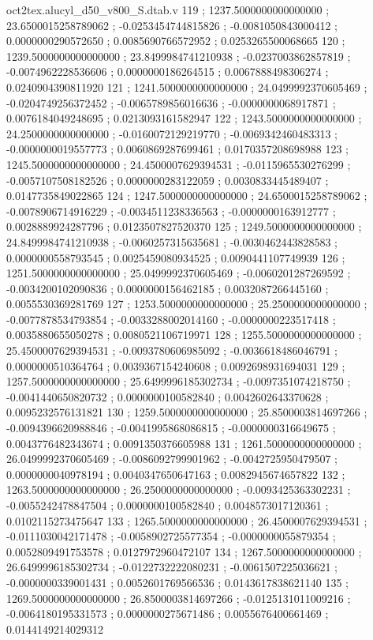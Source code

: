 \begin{filecontents}[overwrite]{oct2tex.alucyl_d50_v800_S.dtab.v}
119 ; 1237.5000000000000000 ; 23.6500015258789062 ; -0.0253454744815826 ; -0.0081050843000412 ; 0.0000000290572650 ; 0.0085690766572952 ; 0.0253265500068665
120 ; 1239.5000000000000000 ; 23.8499984741210938 ; -0.0237003862857819 ; -0.0074962228536606 ; 0.0000000186264515 ; 0.0067888498306274 ; 0.0240904390811920
121 ; 1241.5000000000000000 ; 24.0499992370605469 ; -0.0204749256372452 ; -0.0065789856016636 ; -0.0000000068917871 ; 0.0076184049248695 ; 0.0213093161582947
122 ; 1243.5000000000000000 ; 24.2500000000000000 ; -0.0160072129219770 ; -0.0069342460483313 ; -0.0000000019557773 ; 0.0060869287699461 ; 0.0170357208698988
123 ; 1245.5000000000000000 ; 24.4500007629394531 ; -0.0115965530276299 ; -0.0057107508182526 ; 0.0000000283122059 ; 0.0030833445489407 ; 0.0147735849022865
124 ; 1247.5000000000000000 ; 24.6500015258789062 ; -0.0078906714916229 ; -0.0034511238336563 ; -0.0000000163912777 ; 0.0028889924287796 ; 0.0123507827520370
125 ; 1249.5000000000000000 ; 24.8499984741210938 ; -0.0060257315635681 ; -0.0030462443828583 ; 0.0000000558793545 ; 0.0025459080934525 ; 0.0090441107749939
126 ; 1251.5000000000000000 ; 25.0499992370605469 ; -0.0060201287269592 ; -0.0034200102090836 ; 0.0000000156462185 ; 0.0032087266445160 ; 0.0055530369281769
127 ; 1253.5000000000000000 ; 25.2500000000000000 ; -0.0077878534793854 ; -0.0033288002014160 ; -0.0000000223517418 ; 0.0035880655050278 ; 0.0080521106719971
128 ; 1255.5000000000000000 ; 25.4500007629394531 ; -0.0093780606985092 ; -0.0036618486046791 ; 0.0000000510364764 ; 0.0039367154240608 ; 0.0092698931694031
129 ; 1257.5000000000000000 ; 25.6499996185302734 ; -0.0097351074218750 ; -0.0041440650820732 ; 0.0000000100582840 ; 0.0042602643370628 ; 0.0095232576131821
130 ; 1259.5000000000000000 ; 25.8500003814697266 ; -0.0094396620988846 ; -0.0041995868086815 ; -0.0000000316649675 ; 0.0043776482343674 ; 0.0091350376605988
131 ; 1261.5000000000000000 ; 26.0499992370605469 ; -0.0086092799901962 ; -0.0042725950479507 ; 0.0000000040978194 ; 0.0040347650647163 ; 0.0082945674657822
132 ; 1263.5000000000000000 ; 26.2500000000000000 ; -0.0093425363302231 ; -0.0055242478847504 ; 0.0000000100582840 ; 0.0048573017120361 ; 0.0102115273475647
133 ; 1265.5000000000000000 ; 26.4500007629394531 ; -0.0111030042171478 ; -0.0058902725577354 ; -0.0000000055879354 ; 0.0052809491753578 ; 0.0127972960472107
134 ; 1267.5000000000000000 ; 26.6499996185302734 ; -0.0122732222080231 ; -0.0061507225036621 ; -0.0000000339001431 ; 0.0052601769566536 ; 0.0143617838621140
135 ; 1269.5000000000000000 ; 26.8500003814697266 ; -0.0125131011009216 ; -0.0064180195331573 ; 0.0000000275671486 ; 0.0055676400661469 ; 0.0144149214029312

\end{filecontents}

